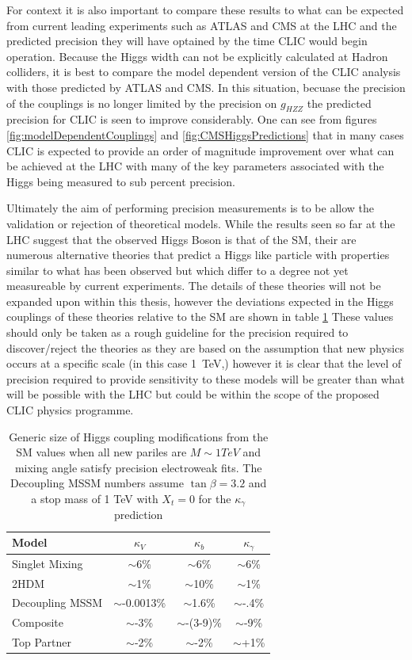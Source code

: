 For context it is also important to compare these results to what can be expected from current leading experiments such as ATLAS and CMS at the LHC and the predicted precision they will have optained by the time CLIC would begin operation. Because the Higgs width can not be explicitly calculated at Hadron colliders, it is best to compare the model dependent version of the CLIC analysis with those predicted by ATLAS and CMS. In this situation, becuase the precision of the couplings is no longer limited by the precision on $g_{HZZ}$ the predicted precision for CLIC is seen to improve considerably. One can see from figures \ref{fig:modelDependentCouplings} and \ref{fig:CMSHiggsPredictions} that in many cases CLIC is expected to provide an order of magnitude improvement over what can be achieved at the LHC with many of the key parameters associated with the Higgs being measured to sub percent precision.

Ultimately the aim of performing precision measurements is to be allow the validation or rejection of theoretical models. While the results seen so far at the LHC suggest that the observed Higgs Boson is that of the \ac{SM}, their are numerous alternative theories that predict a Higgs like particle with properties similar to what has been observed but which differ to a degree not yet measureable by current experiments. The details of these theories will not be expanded upon within this thesis, however the deviations expected in the Higgs couplings of these theories relative to the \ac{SM} are shown in table \ref{table:snowmass} These values should only be taken as a rough guideline for the precision required to discover/reject the theories as they are based on the assumption that new physics occurs at a specific scale (in this case 1~TeV,) however it is clear that the level of precision required to provide sensitivity to these models will be greater than what will be possible with the LHC but could be within the scope of the proposed CLIC physics programme.  

\begin{table}
  \centering
  \begin{tabular}{l c c c}
    \toprule
    \toprule
    Model  & $\kappa_V$ & $\kappa_b$ & $\kappa_\gamma$  \\
    \midrule
    Singlet Mixing & $\sim$6\% & $\sim$6\%  & $\sim$6\% \\
    2HDM & $\sim$1\% & $\sim$10\%  & $\sim$1\% \\
    Decoupling MSSM & $\sim$-0.0013\% & $\sim$1.6\%  & $\sim$-.4\% \\
    Composite & $\sim$-3\% & $\sim$-(3-9)\%  & $\sim$-9\% \\
    Top Partner & $\sim$-2\% & $\sim$-2\%  & $\sim$+1\% \\
    \bottomrule
    \bottomrule
  \end{tabular}
  \caption{Generic size of Higgs coupling modifications from the \ac{SM} values when all new pariles are $M\sim 1 TeV$ and mixing angle satisfy precision electroweak fits. The Decoupling MSSM numbers assume $\tan\beta = 3.2$ and a stop mass of 1 TeV with $X_t =0$ for the $\kappa_\gamma$ prediction \cite{Dawson:2013bba}}
  \label{table:snowmass}
\end{table}

